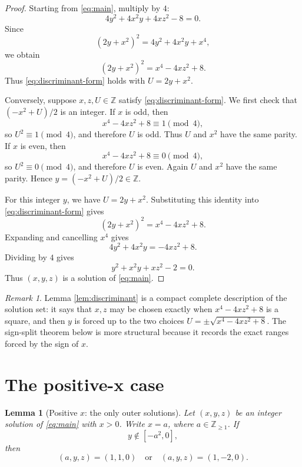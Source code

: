 \documentclass[11pt]{article}
\newtheorem{lemma}[theorem]{Lemma}
\theoremstyle{remark}
\newtheorem{remark}[theorem]{Remark}
\newcommand{\Z}{\mathbb Z}
\newcommand{\Zpos}{\mathbb Z_{\ge 1}}
\begin{document}
\begin{proof}
Starting from \eqref{eq:main}, multiply by $4$:
\[
        4y^2+4x^2y+4xz^2-8=0.
\]
Since
\[
        (2y+x^2)^2=4y^2+4x^2y+x^4,
\]
we obtain
\[
        (2y+x^2)^2=x^4-4xz^2+8.
\]
Thus \eqref{eq:discriminant-form} holds with $U=2y+x^2$.

Conversely, suppose $x,z,U\in\Z$ satisfy \eqref{eq:discriminant-form}.  We first check that $(-x^2+U)/2$ is an integer.  If $x$ is odd, then
\[
        x^4-4xz^2+8\equiv 1\pmod 4,
\]
so $U^2\equiv 1\pmod 4$, and therefore $U$ is odd.  Thus $U$ and $x^2$ have the same parity.  If $x$ is even, then
\[
        x^4-4xz^2+8\equiv 0\pmod 4,
\]
so $U^2\equiv 0\pmod 4$, and therefore $U$ is even.  Again $U$ and $x^2$ have the same parity.  Hence $y=(-x^2+U)/2\in\Z$.

For this integer $y$, we have $U=2y+x^2$.  Substituting this identity into \eqref{eq:discriminant-form} gives
\[
        (2y+x^2)^2=x^4-4xz^2+8.
\]
Expanding and cancelling $x^4$ gives
\[
        4y^2+4x^2y=-4xz^2+8.
\]
Dividing by $4$ gives
\[
        y^2+x^2y+xz^2-2=0.
\]
Thus $(x,y,z)$ is a solution of \eqref{eq:main}.
\end{proof}

\begin{remark}
Lemma \ref{lem:discriminant} is a compact complete description of the solution set: it says that $x,z$ may be chosen exactly when $x^4-4xz^2+8$ is a square, and then $y$ is forced up to the two choices $U=\pm\sqrt{x^4-4xz^2+8}$.  The sign-split theorem below is more structural because it records the exact ranges forced by the sign of $x$.
\end{remark}

\section{The positive-x case}

\begin{lemma}[Positive $x$: the only outer solutions]\label{lem:positive-outer}
Let $(x,y,z)$ be an integer solution of \eqref{eq:main} with $x>0$.  Write $x=a$, where $a\in\Zpos$.  If
\[
        y\notin [-a^2,0],
\]
then
\[
        (a,y,z)=(1,1,0)
        \quad\text{or}\quad
        (a,y,z)=(1,-2,0).
\]
\end{lemma}
\end{document}
